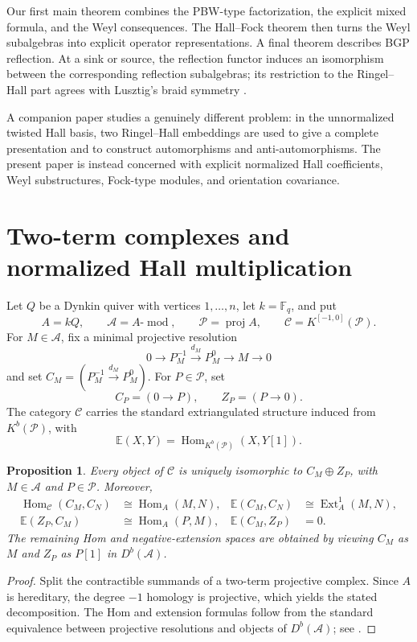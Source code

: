 \documentclass[12pt]{article}
\newcommand{\cA}{\mathcal A}
\newcommand{\cC}{\mathcal C}
\newcommand{\cP}{\mathscr P}
\newcommand{\EE}{\mathbb E}
\newcommand{\Hom}{\operatorname{Hom}}
\newcommand{\Ext}{\operatorname{Ext}}
\newcommand{\proj}{\operatorname{proj}}
\newcommand{\modu}{\operatorname{mod}}
\newcommand{\Ktwo}{K^{[-1,0]}}
\theoremstyle{plain}
\newtheorem{proposition}[theorem]{Proposition}
\theoremstyle{remark}
\begin{document}
Our first main theorem combines the PBW-type factorization, the explicit
mixed formula, and the Weyl consequences. The Hall--Fock theorem then turns
the Weyl subalgebras into explicit operator representations. A final theorem
describes BGP reflection. At a sink or source, the reflection functor induces
an isomorphism between the corresponding reflection subalgebras; its
restriction to the Ringel--Hall part agrees with Lusztig's braid symmetry
\cite{BGP73,XY01,DX02}.

A companion paper studies a genuinely different problem: in the
unnormalized twisted Hall basis, two Ringel--Hall embeddings are used to give
a complete presentation and to construct automorphisms and
anti-automorphisms. The present paper is instead concerned with explicit
normalized Hall coefficients, Weyl substructures, Fock-type modules, and
orientation covariance.
\section{Two-term complexes and normalized Hall multiplication}

Let $Q$ be a Dynkin quiver with vertices $1,\ldots,n$, let $k=\mathbb F_q$,
and put
\[
 A=kQ,\qquad \cA=A\text{-}\modu,\qquad \cP=\proj A,
 \qquad \cC=\Ktwo(\cP).
\]
For $M\in\cA$, fix a minimal projective resolution
\[
 0\longrightarrow P_M^{-1}\xrightarrow{d_M}P_M^0
 \longrightarrow M\longrightarrow0
\]
and set $C_M=(P_M^{-1}\xrightarrow{d_M}P_M^0)$. For $P\in\cP$, set
\[
 C_P=(0\longrightarrow P),\qquad Z_P=(P\longrightarrow0).
\]
The category $\cC$ carries the standard extriangulated structure induced
from $K^b(\cP)$, with
\[
 \EE(X,Y)=\Hom_{K^b(\cP)}(X,Y[1]).
\]

\begin{proposition}\label{prop:decomposition}
Every object of $\cC$ is uniquely isomorphic to $C_M\oplus Z_P$, with
$M\in\cA$ and $P\in\cP$. Moreover,
\begin{align*}
 \Hom_{\cC}(C_M,C_N)&\cong\Hom_A(M,N),&
 \EE(C_M,C_N)&\cong\Ext_A^1(M,N),\\
 \EE(Z_P,C_M)&\cong\Hom_A(P,M),&
 \EE(C_M,Z_P)&=0.
\end{align*}
The remaining Hom and negative-extension spaces are obtained by viewing
$C_M$ as $M$ and $Z_P$ as $P[1]$ in $D^b(\cA)$.
\end{proposition}

\begin{proof}
Split the contractible summands of a two-term projective complex. Since $A$
is hereditary, the degree $-1$ homology is projective, which yields the
stated decomposition. The Hom and extension formulas follow from the
standard equivalence between projective resolutions and objects of
$D^b(\cA)$; see \cite{Gar24}.
\end{proof}
\end{document}
